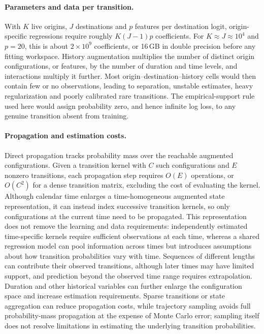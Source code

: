 \documentclass[11pt]{article}
\begin{document}
\paragraph{Parameters and data per transition.} With $K$ live origins, $J$ destinations and $p$ features per destination logit, origin-specific regressions require roughly $K(J-1)p$ coefficients. For $K\approx J\approx 10^{4}$ and $p=20$, this is about $2\times10^{9}$ coefficients, or 16\,GB in double precision before any fitting workspace. History augmentation multiplies the number of distinct origin configurations, or features, by the number of duration and time levels, and interactions multiply it further. Most origin--destination--history cells would then contain few or no observations, leading to separation, unstable estimates, heavy regularization and poorly calibrated rare transitions. The empirical-support rule used here would assign probability zero, and hence infinite log loss, to any genuine transition absent from training.

\paragraph{Propagation and estimation costs.} Direct propagation tracks probability mass over the reachable augmented configurations. Given a transition kernel with $C$ such configurations and $E$ nonzero transitions, each propagation step requires $O(E)$ operations, or $O(C^2)$ for a dense transition matrix, excluding the cost of evaluating the kernel. Although calendar time enlarges a time-homogeneous augmented state representation, it can instead index successive transition kernels, so only configurations at the current time need to be propagated. This representation does not remove the learning and data requirements: independently estimated time-specific kernels require sufficient observations at each time, whereas a shared regression model can pool information across times but introduces assumptions about how transition probabilities vary with time. Sequences of different lengths can contribute their observed transitions, although later times may have limited support, and prediction beyond the observed time range requires extrapolation. Duration and other historical variables can further enlarge the configuration space and increase estimation requirements. Sparse transitions or state aggregation can reduce propagation costs, while trajectory sampling avoids full probability-mass propagation at the expense of Monte Carlo error; sampling itself does not resolve limitations in estimating the underlying transition probabilities.
\end{document}
